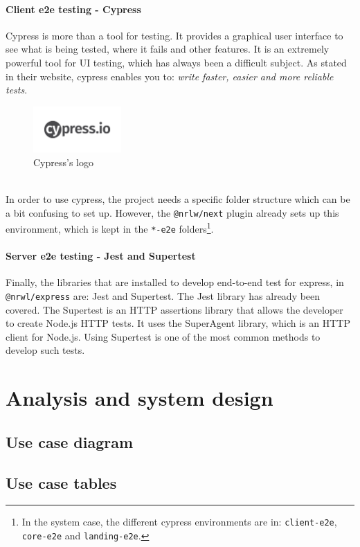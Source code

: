 \documentclass[a4paper, 12pt, oneside]{book}
\begin{document}
\subsubsection{Client e2e testing - Cypress}
Cypress is more than a tool for testing. It provides a graphical user interface to see what is being tested, where it fails and other features. It is an extremely powerful tool for UI testing, which has always been a difficult subject. As stated in their website, cypress enables you to: \emph{write faster, easier and more reliable tests}.
\\
\begin{figure}[h!]
	\centering
	\includegraphics[width=0.3\textwidth]{assets/cypress-logo.png}
	\caption{Cypress's logo}
\end{figure}
\\
In order to use cypress, the project needs a specific folder structure which can be a bit confusing to set up. However, the \texttt{@nrlw/next} plugin already sets up this environment, which is kept in the \texttt{*-e2e} folders\footnote{In the system case, the different cypress environments are in: \texttt{client-e2e}, \texttt{core-e2e} and \texttt{landing-e2e}.}.
\subsubsection{Server e2e testing - Jest and Supertest}
Finally, the libraries that are installed to develop end-to-end test for express, in \texttt{@nrwl/express} are: Jest and Supertest. The Jest library has already been covered. The Supertest is an HTTP assertions library that allows the developer to create Node.js HTTP tests. It uses the SuperAgent library, which is an HTTP client for Node.js. Using Supertest is one of the most common methods to develop such tests.
\chapter{Analysis and system design}
\section{Use case diagram}
\section{Use case tables}
\end{document}

